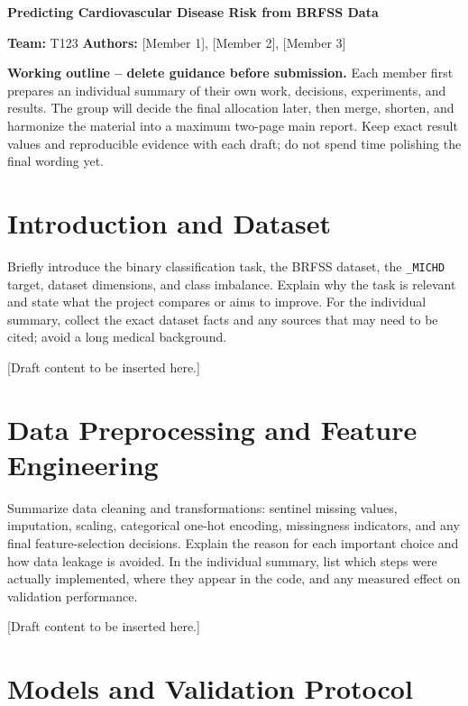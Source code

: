 \documentclass[11pt,a4paper]{article}
\newcommand{\reporttitle}[1]{%
  {\fontsize{16}{19}\selectfont\bfseries #1\par}\vspace{10pt}%
}
\newenvironment{outlinebox}
  {\begin{mdframed}[backgroundcolor=guidancebg,linecolor=guidancebg,linewidth=0pt,
    innerleftmargin=6pt,innerrightmargin=6pt,innertopmargin=5pt,innerbottommargin=5pt,
    skipabove=5pt,skipbelow=8pt]
   \setstretch{1.0}\fontsize{9.5}{11.5}\selectfont\color{guidancetext}
   \setlength{\parskip}{3pt}}
  {\end{mdframed}}
\begin{document}
\reporttitle{Predicting Cardiovascular Disease Risk from BRFSS Data}

\textbf{Team:} T123 \hfill
\textbf{Authors:} [Member 1], [Member 2], [Member 3]

\begin{outlinebox}
\textbf{Working outline -- delete guidance before submission.}
Each member first prepares an individual summary of their own work, decisions,
experiments, and results. The group will decide the final allocation later,
then merge, shorten, and harmonize the material into a maximum two-page main
report. Keep exact result values and reproducible evidence with each draft;
do not spend time polishing the final wording yet.
\end{outlinebox}

\section{Introduction and Dataset}

\begin{outlinebox}
Briefly introduce the binary classification task, the BRFSS dataset, the
\texttt{\_MICHD} target, dataset dimensions, and class imbalance. Explain why
the task is relevant and state what the project compares or aims to improve.
For the individual summary, collect the exact dataset facts and any sources
that may need to be cited; avoid a long medical background.
\end{outlinebox}

[Draft content to be inserted here.]

\section{Data Preprocessing and Feature Engineering}

\begin{outlinebox}
Summarize data cleaning and transformations: sentinel missing values,
imputation, scaling, categorical one-hot encoding, missingness indicators, and
any final feature-selection decisions. Explain the reason for each important
choice and how data leakage is avoided. In the individual summary, list which
steps were actually implemented, where they appear in the code, and any
measured effect on validation performance.
\end{outlinebox}

[Draft content to be inserted here.]

\section{Models and Validation Protocol}
\end{document}
